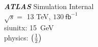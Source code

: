 \documentclass[varwidth]{standalone}
\begin{document}
\textbf{\textit{ATLAS}} Simulation Internal\\
$\sqrt{s} = $ 13 TeV, $130 \ \textsf{fb}^{-1}$\\
siunitx: \SI{15}{\GeV}\\
physics: $\qty(\frac{1}{2})$
\end{document}
